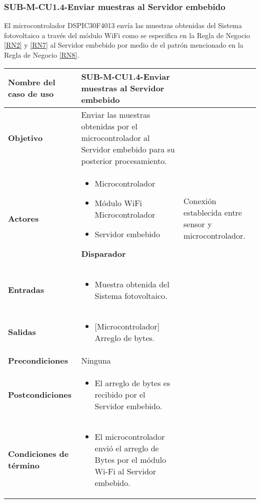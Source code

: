 \subsubsection{SUB-M-CU1.4-Enviar muestras al Servidor embebido}\label{SUB-M-CU1.4}
El microcontrolador DSPIC30F4013 envía las muestras obtenidas del Sistema fotovoltaico a través del módulo WiFi como se especifica en la Regla de Negocio \ref{RN2} y \ref{RN7} al Servidor embebido por medio de el patrón mencionado en la Regla de Negocio \ref{RN8}.
\begin{longtable}{|J{5cm}|J{10.3cm}|}
	\hline
	\textbf{Nombre del caso de uso} &
		SUB-M-CU1.4-Enviar muestras al Servidor embebido \\ \hline
	\textbf{Objetivo} &
		Enviar las muestras obtenidas por el microcontrolador al Servidor embebido para su posterior procesamiento. \\ \hline
	\textbf{Actores} &
	    \begin{itemize}
		    \item Microcontrolador
		    \item Módulo WiFi Microcontrolador
		    \item Servidor embebido
		\end{itemize} \hline 
	\textbf{Disparador} & 
		Conexión establecida entre sensor y microcontrolador.\\ \hline
	\textbf{Entradas} & %
		\begin{itemize}%
				\item Muestra obtenida del Sistema fotovoltaico.
		\end{itemize}
		\\ \hline 
	\textbf{Salidas} & 
	    \begin{itemize}%
	        \item {[Microcontrolador]} Arreglo de bytes.
	    \end{itemize}\\ \hline
	\textbf{Precondiciones} & Ninguna
		\\ \hline
	\textbf{Postcondiciones} &
		\begin{itemize}
			\item El arreglo de bytes es recibido por el Servidor embebido.
		\end{itemize} \\ \hline
	\textbf{Condiciones de término} & 
		\begin{itemize}
		    \item El microcontrolador envió el arreglo de Bytes por el módulo Wi-Fi al Servidor embebido.

\end{itemize}
\end{longtable}
